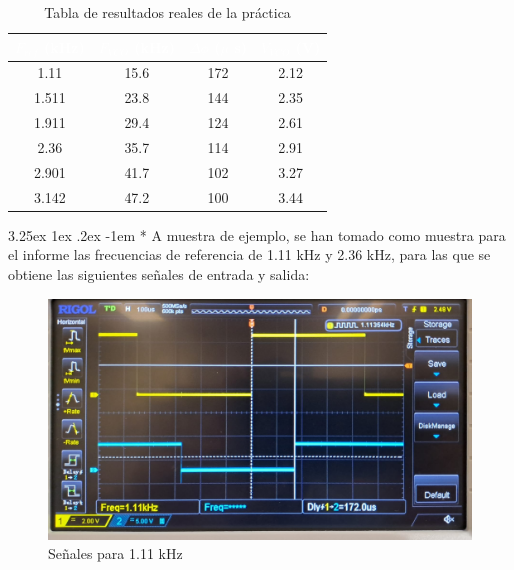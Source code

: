 \documentclass[12pt]{article}
\makeatletter
\renewcommand\paragraph{\@startsection{paragraph}{5}{\z@}%
  {3.25ex \@plus1ex \@minus.2ex}%
  {-1em}%
  {\normalfont\normalsize\bfseries}}
\makeatother
\begin{document}
    \begin{table}[H]
      \begin{center}
          \begin{tabular}{| c | c | c | c |}
              \hline
              \rowcolor{black}
              \textcolor{white}{$F_{ref}$ (kHz)} & \textcolor{white}{$F_{VCO}$ (kHz)} & \textcolor{white}{$\Delta \phi$ ($\mu$ s)} & \textcolor{white}{$V_{VCO}$ (V)}\\ \hline
              1.11 & 15.6 & 172 &  2.12\\ \hline
              1.511 & 23.8 & 144 &  2.35\\ \hline
              1.911 & 29.4 & 124 &  2.61\\ \hline
              2.36 & 35.7 & 114 & 2.91\\ \hline
              2.901 & 41.7 & 102 &  3.27\\ \hline
              3.142 & 47.2 & 100 & 3.44\\ 
              \hline 
          \end{tabular}
          \caption{Tabla de resultados reales de la práctica}
          \label{tab:resul_r}
      \end{center}
    \end{table}

  \paragraph*{}
    A muestra de ejemplo, se han tomado como muestra para el informe las frecuencias de referencia de 1.11 kHz y 2.36 kHz, para las que se obtiene
    las siguientes señales de entrada y salida:

    \begin{figure}[H]
      \centering
      \includegraphics[width=1\linewidth]{img/1khz.jpeg}
      \caption{Señales para 1.11 kHz}%
      \label{fig:1khz}
    \end{figure}
\end{document}
